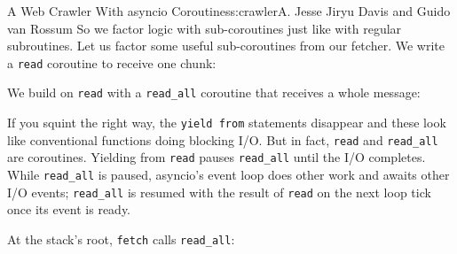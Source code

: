 \begin{aosachapter}{A Web Crawler With asyncio Coroutines}{s:crawler}{A. Jesse Jiryu Davis and Guido van Rossum}
So we factor logic with sub-coroutines just like with regular
subroutines. Let us factor some useful sub-coroutines from our fetcher.
We write a \texttt{read} coroutine to receive one chunk:

\begin{Shaded}
\begin{Highlighting}[]
 

     
        \NormalTok{))}

     
     
\end{Highlighting}
\end{Shaded}

We build on \texttt{read} with a \texttt{read\_all} coroutine that
receives a whole message:

\begin{Shaded}
\begin{Highlighting}[]
 
      
     
          

     
\end{Highlighting}
\end{Shaded}

If you squint the right way, the \texttt{yield from} statements
disappear and these look like conventional functions doing blocking I/O.
But in fact, \texttt{read} and \texttt{read\_all} are coroutines.
Yielding from \texttt{read} pauses \texttt{read\_all} until the I/O
completes. While \texttt{read\_all} is paused, asyncio's event loop does
other work and awaits other I/O events; \texttt{read\_all} is resumed
with the result of \texttt{read} on the next loop tick once its event is
ready.

At the stack's root, \texttt{fetch} calls \texttt{read\_all}:

\begin{Shaded}
\begin{Highlighting}[]
 
     \NormalTok{):}
        \NormalTok{))}
          
\end{Highlighting}
\end{Shaded}


\end{aosachapter}
